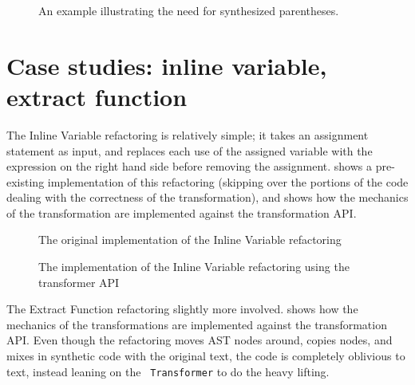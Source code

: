 \begin{figure}
\begin{minipage}{0.5\linewidth}

\end{minipage}
\hfill \hspace{.3cm} \hfill
\begin{minipage}{0.5\linewidth}

\end{minipage}
\caption{An example illustrating the need for synthesized parentheses.}
\label{Fig:NeedParens}
\end{figure}

\section{Case studies: inline variable, extract function}

The Inline Variable refactoring is relatively simple; it takes an assignment
statement as input, and replaces each use of the assigned variable with the
expression on the right hand side before removing the assignment.
 shows a pre-existing implementation of this
refactoring (skipping over the portions of the code dealing with the
correctness of the transformation), and  shows
how the mechanics of the transformation are implemented against the
transformation API.


\begin{figure}

\caption{The original implementation of the Inline Variable refactoring}
\label{Fig:InlineVariableBefore}
\end{figure}

\begin{figure}

\caption{The implementation of the Inline Variable refactoring using the transformer API}
\label{Fig:InlineVariableAfter}
\end{figure}

The Extract Function refactoring slightly more involved.
 shows how the mechanics of the transformations are
implemented against the transformation API. Even though the refactoring moves
AST nodes around, copies nodes, and mixes in synthetic code with the original
text, the code is completely oblivious to text, instead leaning on the {\tt
Transformer} to do the heavy lifting.

